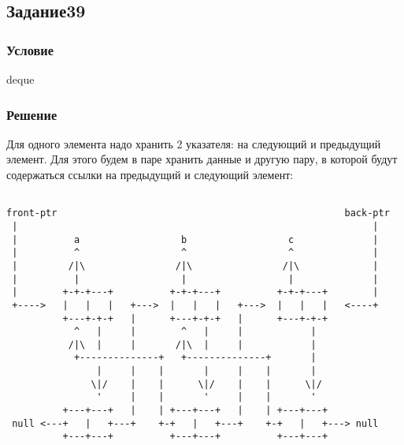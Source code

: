 \documentclass[10pt,a4paper]{article}
\begin{document}
\subsection*{Задание39}
\subsubsection*{Условие}
deque 
\subsubsection*{Решение}
Для одного элемента надо хранить 2 указателя: на следующий и
предыдущий элемент. Для этого будем в паре хранить данные и другую
пару, в которой будут содержаться ссылки на предыдущий и следующий
элемент:
\begin{lstlisting}

front-ptr                                                   back-ptr
 |                                                               | 
 |          a                  b                  c              |
 |          ^                  ^                  ^              |
 |         /|\                /|\                /|\             |
 |          |                  |                  |              |
 |        +-+-+---+          +-+-+---+          +-+-+---+        |
 +---->   |   |   |   +--->  |   |   |   +--->  |   |   |   <----+
          +---+-+-+   |      +---+-+-+   |      +---+-+-+ 
            ^   |     |        ^   |     |            |
           /|\  |     |       /|\  |     |            |
            +--------------+   +--------------+       |
                |     |    |       |     |    |       |
               \|/    |    |      \|/    |    |      \|/
                '     |    |       '     |    |       '
          +---+---+   |    | +---+---+   |    | +---+---+
 null <---+   |   +---+    +-+   |   +---+    +-+   |   +---> null
          +---+---+          +---+---+          +---+---+

\end{lstlisting}
\end{document}
